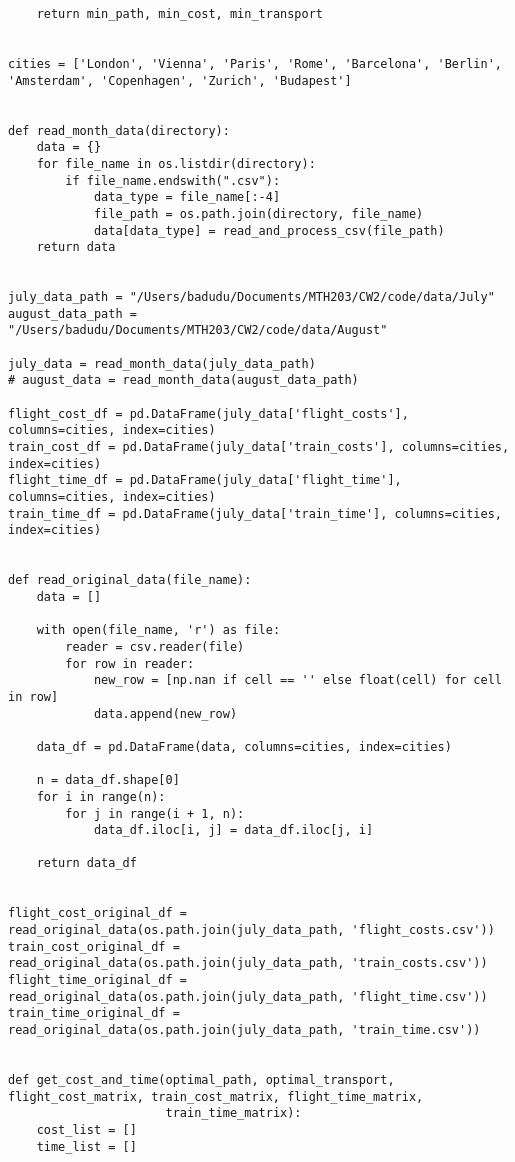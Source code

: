 \documentclass{article} %
\begin{document}
\begin{lstlisting}
    return min_path, min_cost, min_transport


cities = ['London', 'Vienna', 'Paris', 'Rome', 'Barcelona', 'Berlin', 'Amsterdam', 'Copenhagen', 'Zurich', 'Budapest']


def read_month_data(directory):
    data = {}
    for file_name in os.listdir(directory):
        if file_name.endswith(".csv"):
            data_type = file_name[:-4]
            file_path = os.path.join(directory, file_name)
            data[data_type] = read_and_process_csv(file_path)
    return data


july_data_path = "/Users/badudu/Documents/MTH203/CW2/code/data/July"
august_data_path = "/Users/badudu/Documents/MTH203/CW2/code/data/August"

july_data = read_month_data(july_data_path)
# august_data = read_month_data(august_data_path)

flight_cost_df = pd.DataFrame(july_data['flight_costs'], columns=cities, index=cities)
train_cost_df = pd.DataFrame(july_data['train_costs'], columns=cities, index=cities)
flight_time_df = pd.DataFrame(july_data['flight_time'], columns=cities, index=cities)
train_time_df = pd.DataFrame(july_data['train_time'], columns=cities, index=cities)


def read_original_data(file_name):
    data = []

    with open(file_name, 'r') as file:
        reader = csv.reader(file)
        for row in reader:
            new_row = [np.nan if cell == '' else float(cell) for cell in row]
            data.append(new_row)

    data_df = pd.DataFrame(data, columns=cities, index=cities)

    n = data_df.shape[0]
    for i in range(n):
        for j in range(i + 1, n):
            data_df.iloc[i, j] = data_df.iloc[j, i]

    return data_df


flight_cost_original_df = read_original_data(os.path.join(july_data_path, 'flight_costs.csv'))
train_cost_original_df = read_original_data(os.path.join(july_data_path, 'train_costs.csv'))
flight_time_original_df = read_original_data(os.path.join(july_data_path, 'flight_time.csv'))
train_time_original_df = read_original_data(os.path.join(july_data_path, 'train_time.csv'))


def get_cost_and_time(optimal_path, optimal_transport, flight_cost_matrix, train_cost_matrix, flight_time_matrix,
                      train_time_matrix):
    cost_list = []
    time_list = []


\end{lstlisting}
\end{document}

